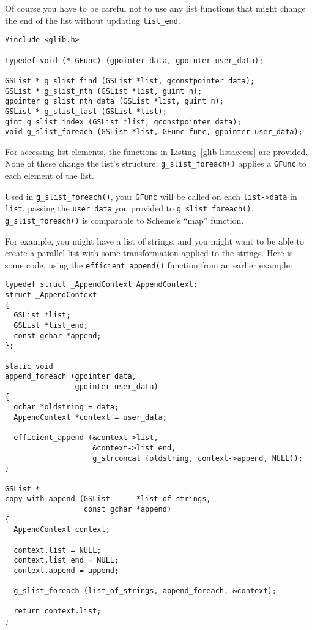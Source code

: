 Of course you have to be careful not to use any list functions that might change the end of the list without updating \lstinline{list_end}.

\begin{lstlisting}[float, caption={Accessing data in a linked list}, label=glib-listaccess]
#include <glib.h>

typedef void (* GFunc) (gpointer data, gpointer user_data);

GSList * g_slist_find (GSList *list, gconstpointer data);
GSList * g_slist_nth (GSList *list, guint n);
gpointer g_slist_nth_data (GSList *list, guint n);
GSList * g_slist_last (GSList *list);
gint g_slist_index (GSList *list, gconstpointer data);
void g_slist_foreach (GSList *list, GFunc func, gpointer user_data);
\end{lstlisting}

For accessing list elements, the functions in Listing~\ref{glib-listaccess} are provided. None of these change the list's structure. \lstinline{g_slist_foreach()} applies a \lstinline{GFunc} to each element of the list.

Used in \lstinline{g_slist_foreach()}, your \lstinline{GFunc} will be called on each \lstinline{list->data} in \lstinline{list}, passing the \lstinline{user_data} you provided to \lstinline{g_slist_foreach()}. \lstinline{g_slist_foreach()} is comparable to Scheme's ``map'' function.

For example, you might have a list of strings, and you might want to be able to create a parallel list with some transformation applied to the strings. Here is some code, using the \lstinline{efficient_append()} function from an earlier example:

\begin{lstlisting}
typedef struct _AppendContext AppendContext;
struct _AppendContext
{
  GSList *list;
  GSList *list_end;
  const gchar *append;
};

static void
append_foreach (gpointer data,
                gpointer user_data)
{
  gchar *oldstring = data;
  AppendContext *context = user_data;

  efficient_append (&context->list,
                    &context->list_end,
                    g_strconcat (oldstring, context->append, NULL));
}

GSList *
copy_with_append (GSList      *list_of_strings,
                  const gchar *append)
{
  AppendContext context;

  context.list = NULL;
  context.list_end = NULL;
  context.append = append;

  g_slist_foreach (list_of_strings, append_foreach, &context);

  return context.list;
}
\end{lstlisting}

